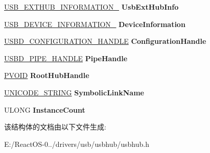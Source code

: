 \begin{DoxyCompactItemize}
\item 
\mbox{\label{struct___h_u_b___d_e_v_i_c_e___e_x_t_e_n_s_i_o_n_a95c4fe254a17703ac322596b7842f095}} 
\hyperlink{struct___u_s_b___e_x_t_h_u_b___i_n_f_o_r_m_a_t_i_o_n__0}{U\+S\+B\+\_\+\+E\+X\+T\+H\+U\+B\+\_\+\+I\+N\+F\+O\+R\+M\+A\+T\+I\+O\+N\+\_} {\bfseries Usb\+Ext\+Hub\+Info}
\item 
\mbox{\label{struct___h_u_b___d_e_v_i_c_e___e_x_t_e_n_s_i_o_n_a4701a1558e63e24e75f80afbd62eab5d}} 
\hyperlink{struct___u_s_b___d_e_v_i_c_e___i_n_f_o_r_m_a_t_i_o_n__0}{U\+S\+B\+\_\+\+D\+E\+V\+I\+C\+E\+\_\+\+I\+N\+F\+O\+R\+M\+A\+T\+I\+O\+N\+\_} {\bfseries Device\+Information}
\item 
\mbox{\label{struct___h_u_b___d_e_v_i_c_e___e_x_t_e_n_s_i_o_n_a56da8e06e8f4fee4195699c0e2924133}} 
\hyperlink{interfacevoid}{U\+S\+B\+D\+\_\+\+C\+O\+N\+F\+I\+G\+U\+R\+A\+T\+I\+O\+N\+\_\+\+H\+A\+N\+D\+LE} {\bfseries Configuration\+Handle}
\item 
\mbox{\label{struct___h_u_b___d_e_v_i_c_e___e_x_t_e_n_s_i_o_n_ad25c84c59d5f84b8659c223ab47f7a4e}} 
\hyperlink{interfacevoid}{U\+S\+B\+D\+\_\+\+P\+I\+P\+E\+\_\+\+H\+A\+N\+D\+LE} {\bfseries Pipe\+Handle}
\item 
\mbox{\label{struct___h_u_b___d_e_v_i_c_e___e_x_t_e_n_s_i_o_n_ae4dac55b8ce2e55e57092521172f0487}} 
\hyperlink{interfacevoid}{P\+V\+O\+ID} {\bfseries Root\+Hub\+Handle}
\item 
\mbox{\label{struct___h_u_b___d_e_v_i_c_e___e_x_t_e_n_s_i_o_n_a589926b1d393419759c7912a9e84f38f}} 
\hyperlink{struct___u_n_i_c_o_d_e___s_t_r_i_n_g}{U\+N\+I\+C\+O\+D\+E\+\_\+\+S\+T\+R\+I\+NG} {\bfseries Symbolic\+Link\+Name}
\item 
\mbox{\label{struct___h_u_b___d_e_v_i_c_e___e_x_t_e_n_s_i_o_n_ad6452bb16e0d96517bff56b3a3683fd2}} 
U\+L\+O\+NG {\bfseries Instance\+Count}
\end{DoxyCompactItemize}


该结构体的文档由以下文件生成\+:\begin{DoxyCompactItemize}
\item 
E\+:/\+React\+O\+S-\/0../drivers/usb/usbhub/usbhub.\+h\end{DoxyCompactItemize}
